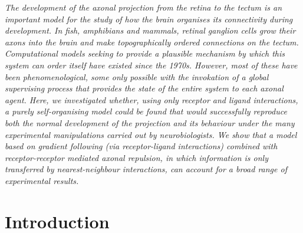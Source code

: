 \documentclass[11pt, a4paper]{article}
\begin{document}

\emph{The development of the axonal projection from the retina to the tectum
is an important model for the study of how the brain organises its
connectivity during development. In fish, amphibians and mammals, retinal
ganglion cells grow their axons into the brain and make topographically
ordered connections on the tectum.
%
Computational models seeking to provide a plausible mechanism by which this
system can order itself have existed since the 1970s. However, most of these
have been phenomenological, some only possible with the invokation of a global
supervising process that provides the state of the entire system to each
axonal agent.
%
Here, we investigated whether, using only receptor and ligand interactions, a
purely self-organising model could be found that would successfully reproduce
both the normal development of the projection and its behaviour under the many
experimental manipulations carried out by neurobiologists.
%
We show that a model based on gradient following (via receptor-ligand
interactions) combined with receptor-receptor mediated axonal repulsion, in
which information is only transferred by nearest-neighbour interactions, can
account for a broad range of experimental results.
}

\section{Introduction}
\end{document}

